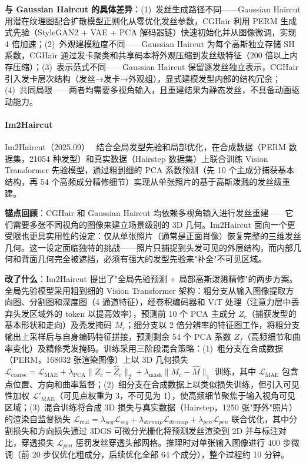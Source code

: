 \textbf{与 Gaussian Haircut 的具体差异}：(1)~发丝生成路径不同——Gaussian Haircut 用潜在纹理图配合扩散模型正则化从零优化发丝参数，CGHair 利用 PERM 生成式先验（StyleGAN2 + VAE + PCA 解码器链）快速初始化并从图像微调，实现 4 倍加速；(2)~外观建模粒度不同——Gaussian Haircut 为每个高斯独立存储 SH 系数，CGHair 通过发卡聚类和共享码本将外观压缩到发丝级特征（200 倍以上内存压缩）；(3)~表示范式不同——Gaussian Haircut 保留逐发丝独立表示，CGHair 引入发卡层次结构（发丝→发卡→外观组），显式建模发型内部的结构冗余；(4)~共同局限——两者均需要多视角输入，且重建结果为静态发丝，不具备动画驱动能力。

\paragraph{Im2Haircut}

Im2Haircut（2025.09）~\cite{2509_01469} 结合全局发型先验和局部优化，在合成数据（PERM 数据集，21054 种发型）和真实数据（Hairstep 数据集）上联合训练 Vision Transformer 先验模型，通过粗到细的 PCA 系数预测（先 10 个主成分捕获基本结构，再 54 个高频成分精修细节）实现从单张照片的基于高斯泼溅的发丝级重建。

\textbf{锚点回顾}：CGHair 和 Gaussian Haircut 均依赖多视角输入进行发丝重建——它们需要多张不同视角的图像来建立场景级别的 3D 几何。Im2Haircut 面向一个更受限也更具实用性的设定：仅从单张照片（通常是正面肖像）恢复完整的三维发丝几何。这一设定面临独特的挑战——照片只捕捉到头发可见的外层结构，而内部几何和背面几何完全被遮挡，必须有强大的发型先验来"补全"不可见区域。

\textbf{改了什么}：Im2Haircut 提出了"全局先验预测 + 局部高斯泼溅精修"的两步方案。全局先验模型采用粗到细的 Vision Transformer 架构：粗分支从输入图像提取方向图、分割图和深度图（4 通道特征），经卷积编码器和 ViT 处理（注意力层中丢弃头发区域外的 token 以提高效率），预测前 10 个 PCA 主成分 $Z_c$（捕获发型的基本形状和走向）及秃发掩码 $M_c$；细分支以 2 倍分辨率的特征图工作，将粗分支输出上采样后与自身编码特征拼接，预测剩余 54 个 PCA 系数 $Z_f$（高频细节和曲率变化）及精修秃发掩码。训练采用三阶段混合策略：(1)~粗分支在合成数据（PERM，168032 张渲染图像）上以 3D 几何损失 $\mathcal{L}_{\text{coarse}} = \mathcal{L}_{\text{MAE}} + \lambda_{\text{PCA}} \|Z_c - \hat{Z}_c\|_2 + \lambda_{\text{mask}} \|M_c - \hat{M}\|_1$ 训练，其中 $\mathcal{L}_{\text{MAE}}$ 包含点位置、方向和曲率监督；(2)~细分支在合成数据上以类似损失训练，但引入可见性加权 $\mathcal{L}'_{\text{MAE}}$（可见点权重为 3，不可见为 1），使高频细节聚焦于输入视角可见区域；(3)~混合训练将合成 3D 损失与真实数据（Hairstep，1250 张"野外"照片）的渲染自监督损失 $\mathcal{L}_{\text{real}} = \lambda_{seg}\mathcal{L}_{seg} + \lambda_{dirmap}\mathcal{L}_{dirmap} + \lambda_{pen}\mathcal{L}_{pen}$ 联合优化，其中分割损失和方向损失通过 3DGS 可微分光栅化将预测发丝渲染到 2D 并与标注对比，穿透损失 $\mathcal{L}_{pen}$ 惩罚发丝穿透头部网格。推理时对单张输入图像进行 400 步微调（前 20 步仅优化粗成分，后续优化全部 64 个成分），整个过程约 10 分钟。

